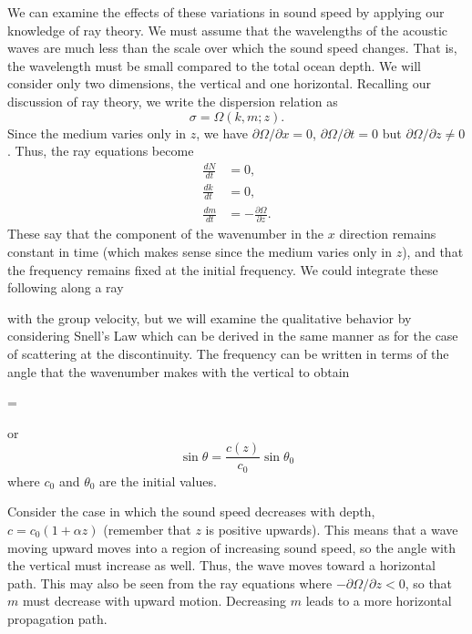 We can examine the effects of these variations in sound speed by applying our
knowledge of ray theory. We must assume that the wavelengths of the acoustic waves
are much less than the scale over which the sound speed changes. That is, the
wavelength must be small compared to the total ocean depth. We will consider only
two dimensions, the vertical and one horizontal. Recalling our discussion of ray theory,
we write the dispersion relation as
\[
	\sigma=\Omega(k,m;z).
\]
Since the medium varies only in $z$, we have $\partial\Omega/\partial x=0$,
$\partial\Omega/\partial t=0$ but $\partial\Omega/\partial z\ne0$.
Thus, the ray equations become
\begin{align*}
	\frac{dN}{dt} & =0,                                  \\
	\frac{dk}{dt} & =0,                                  \\
	\frac{dm}{dt} & =-\frac{\partial\Omega}{\partial z}.
\end{align*}
These say that the component of the wavenumber in the $x$ direction remains constant
in time (which makes sense since the medium varies only in $z$), and that the frequency
remains fixed at the initial frequency. We could integrate these following along a ray

\sourcepagebreak

with the group velocity, but we will examine the qualitative behavior by considering
Snell's Law which can be derived in the same manner as for the case of scattering at
the discontinuity. The frequency can be written in terms of the angle that the
wavenumber makes with the vertical to obtain
\begin{waveequation}
	=
\end{waveequation}
or
\[
	\sin\theta=\frac{c(z)}{c_0}\sin\theta_0
\]
where $c_0$ and $\theta_0$ are the initial values.

Consider the case in which the sound speed decreases with depth,
$c=c_0(1+\alpha z)$ (remember that $z$ is positive upwards). This means that a wave
moving upward moves into a region of increasing sound speed, so the angle with the
vertical must increase as well. Thus, the wave moves toward a horizontal path. This
may also be seen from the ray equations where $-\partial\Omega/\partial z<0$, so that
$m$ must decrease with upward motion. Decreasing $m$ leads to a more horizontal
propagation path.

